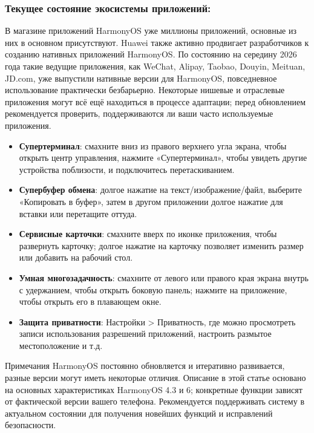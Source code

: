 \subsubsection*{Текущее состояние экосистемы приложений:}

В магазине приложений HarmonyOS уже миллионы приложений, основные из них в основном присутствуют. Huawei также активно продвигает разработчиков к созданию нативных приложений HarmonyOS. По состоянию на середину 2026 года такие ведущие приложения, как WeChat, Alipay, Taobao, Douyin, Meituan, JD.com, уже выпустили нативные версии для HarmonyOS, повседневное использование практически безбарьерно. Некоторые нишевые и отраслевые приложения могут всё ещё находиться в процессе адаптации; перед обновлением рекомендуется проверить, поддерживаются ли ваши часто используемые приложения.


\begin{itemize}
  \item \textbf{Супертерминал}: смахните вниз из правого верхнего угла экрана, чтобы открыть центр управления, нажмите «Супертерминал», чтобы увидеть другие устройства поблизости, и подключитесь перетаскиванием.
  \item \textbf{Супербуфер обмена}: долгое нажатие на текст/изображение/файл, выберите «Копировать в буфер», затем в другом приложении долгое нажатие для вставки или перетащите оттуда.
  \item \textbf{Сервисные карточки}: смахните вверх по иконке приложения, чтобы развернуть карточку; долгое нажатие на карточку позволяет изменить размер или добавить на рабочий стол.
  \item \textbf{Умная многозадачность}: смахните от левого или правого края экрана внутрь с удержанием, чтобы открыть боковую панель; нажмите на приложение, чтобы открыть его в плавающем окне.
  \item \textbf{Защита приватности}: Настройки > Приватность, где можно просмотреть записи использования разрешений приложений, настроить размытое местоположение и т.д.
\end{itemize}

\begin{tcbwarn}{Примечания}
HarmonyOS постоянно обновляется и итеративно развивается, разные версии могут иметь некоторые отличия. Описание в этой статье основано на основных характеристиках HarmonyOS 4.3 и 6; конкретные функции зависят от фактической версии вашего телефона. Рекомендуется поддерживать систему в актуальном состоянии для получения новейших функций и исправлений безопасности.

\end{tcbwarn}

